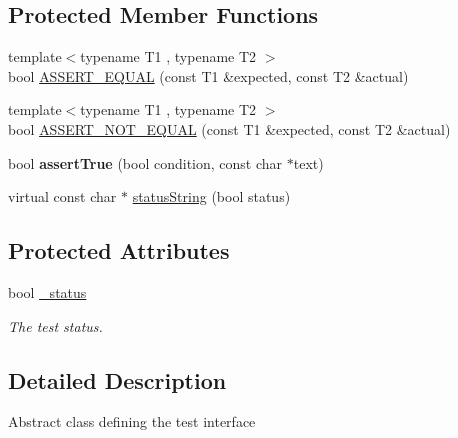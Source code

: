 \subsection*{Protected Member Functions}
\begin{DoxyCompactItemize}
\item 
{\footnotesize template$<$typename T1 , typename T2 $>$ }\\bool \mbox{\hyperlink{class_concept_1_1_unit_test_1_1_test_ab12b779095f2e0a9322c8bffa2c8941b}{A\+S\+S\+E\+R\+T\+\_\+\+E\+Q\+U\+AL}} (const T1 \&expected, const T2 \&actual)
\item 
{\footnotesize template$<$typename T1 , typename T2 $>$ }\\bool \mbox{\hyperlink{class_concept_1_1_unit_test_1_1_test_ad4d91c6b7d271d55fd037c2009b1927e}{A\+S\+S\+E\+R\+T\+\_\+\+N\+O\+T\+\_\+\+E\+Q\+U\+AL}} (const T1 \&expected, const T2 \&actual)
\item 
\mbox{\label{class_concept_1_1_unit_test_1_1_test_ad020550928dbae1a5d55e999411ad722}} 
bool {\bfseries assert\+True} (bool condition, const char $\ast$text)
\item 
virtual const char $\ast$ \mbox{\hyperlink{class_concept_1_1_unit_test_1_1_test_a0aabaa449e45a2a99e473693eed0f3ed}{status\+String}} (bool status)
\end{DoxyCompactItemize}
\subsection*{Protected Attributes}
\begin{DoxyCompactItemize}
\item 
\mbox{\label{class_concept_1_1_unit_test_1_1_test_abd55e8d261a039126769a522b2c6369d}} 
bool \mbox{\hyperlink{class_concept_1_1_unit_test_1_1_test_abd55e8d261a039126769a522b2c6369d}{\+\_\+status}}
\begin{DoxyCompactList}\small\item\em The test status. \end{DoxyCompactList}\end{DoxyCompactItemize}


\subsection{Detailed Description}
Abstract class defining the test interface 

